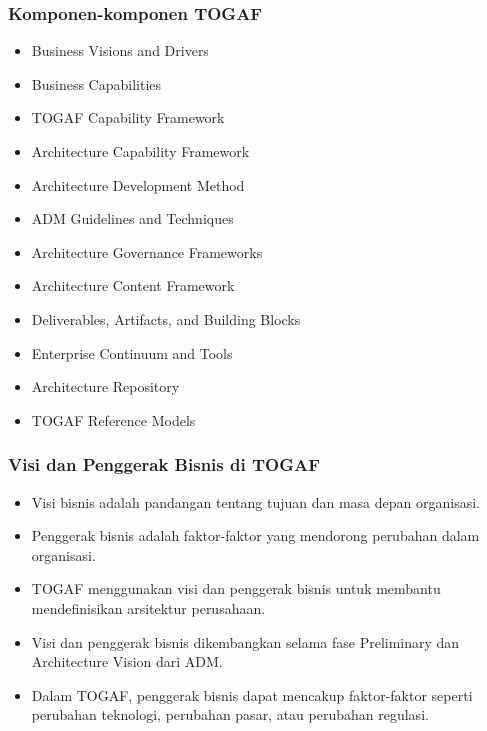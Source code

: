 \documentclass{beamer}
\begin{document}
	\begin{frame}
		\frametitle{Komponen-komponen TOGAF}
		\begin{itemize}
			\item Business Visions and Drivers
			\item Business Capabilities
			\item TOGAF Capability Framework
			\item Architecture Capability Framework
			\item Architecture Development Method
			\item ADM Guidelines and Techniques
			\item Architecture Governance Frameworks
			\item Architecture Content Framework
			\item Deliverables, Artifacts, and Building Blocks
			\item Enterprise Continuum and Tools
			\item Architecture Repository
			\item TOGAF Reference Models
		\end{itemize}
	\end{frame}
	
	\begin{frame}
		\frametitle{Visi dan Penggerak Bisnis di TOGAF}
		\begin{itemize}
			\item Visi bisnis adalah pandangan tentang tujuan dan masa depan organisasi.
			\item Penggerak bisnis adalah faktor-faktor yang mendorong perubahan dalam organisasi.
			\item TOGAF menggunakan visi dan penggerak bisnis untuk membantu mendefinisikan arsitektur perusahaan.
			\item Visi dan penggerak bisnis dikembangkan selama fase Preliminary dan Architecture Vision dari ADM.
			\item Dalam TOGAF, penggerak bisnis dapat mencakup faktor-faktor seperti perubahan teknologi, perubahan pasar, atau perubahan regulasi.
		\end{itemize}
	\end{frame}
	
\end{document}
